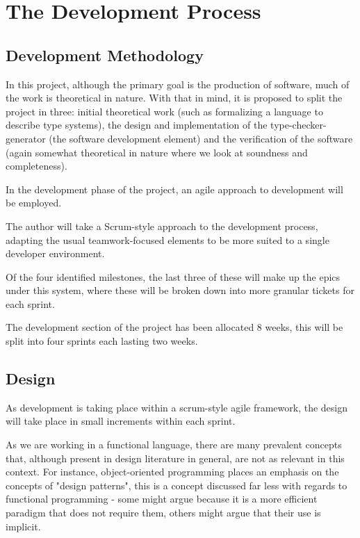 \section{The Development Process}
\subsection{Development Methodology}

In this project, although the primary goal is the production
of software, much of the work is theoretical in nature. With
that in mind, it is proposed to split the project in three:
initial theoretical work (such as formalizing a language to
describe type systems), the design and implementation of the
type-checker-generator (the software development element) and
the verification of the software (again somewhat theoretical
in nature where we look at soundness and completeness).

In the development phase of the project, an agile approach to
development will be employed. 

The author will take a Scrum-style approach to the development
process, adapting the usual teamwork-focused elements to be
more suited to a single developer environment.

Of the four identified milestones, the last three of these
will make up the epics under this system, where these will be
broken down into more granular tickets for each sprint.

The development section of the project has been allocated 8
weeks, this will be split into four sprints each lasting two
weeks. 

\subsection{Design}

As development is taking place within a scrum-style agile framework, the
design will take place in small increments within each
sprint.

As we are working in a functional language, there are many
prevalent concepts that, although present in design literature
in general, are not as relevant in this context. For
instance, object-oriented programming places an emphasis on
the concepts of "design patterns", this is a concept discussed
far less with regards to functional programming - some might
argue because it is a more efficient paradigm that does not
require them, others might argue that their use is implicit.

